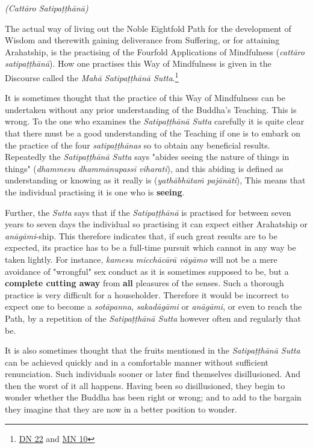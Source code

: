 \emph{(Cattāro Satipaṭṭhānā)}


\label{start}The actual way of living out the Noble Eightfold Path for the
development of Wisdom and therewith gaining deliverance from Suffering,
or for attaining Arahatship, is the practising of the Fourfold
Applications of Mindfulness (\emph{cattāro satipaṭṭhānā}). How one
practises this Way of Mindfulness is given in the Discourse called the
\emph{Mahā Satipaṭṭhānā Sutta}.\footnote{\href{https://suttacentral.net/dn22/en/sujato}{DN 22} and \href{https://suttacentral.net/mn10/en/sujato}{MN 10}}


It is sometimes thought that the practice of this Way of Mindfulness can
be undertaken without any prior understanding of the Buddha’s Teaching.
This is wrong. To the one who examines the \emph{Satipaṭṭhānā Sutta} carefully
it is quite clear that there must be a good understanding of the
Teaching if one is to embark on the practice of the four \emph{satipaṭṭhānas}
so to obtain any beneficial results. Repeatedly the \emph{Satipaṭṭhānā Sutta}
says "abides seeing the nature of things in things" (\emph{dhammesu
dhammānupassī viharati}),
and this abiding is defined as understanding or knowing as
it really is (\emph{yathābhūtaṁ pajānāti}), This means that the individual
practising it is one who is \textbf{seeing}.


Further, the \emph{Sutta} says that if the \emph{Satipaṭṭhānā} is practised for
between seven years to seven days the individual so practising it can
expect either Arahatship or \emph{anāgāmi}-ship. This therefore indicates
that, if such great results are to be expected, its practice has to be a
full-time pursuit which cannot in any way be taken lightly. For
instance, \emph{kamesu micchācārā vāyāmo} will not be a mere avoidance of
"wrongful" sex conduct as it is sometimes supposed to be, but a
\textbf{complete cutting away} from \textbf{all} pleasures of the senses. Such a
thorough practice is very difficult for a householder. Therefore it
would be incorrect to expect one to become a \emph{sotāpanna}, \emph{sakadāgāmi}
or \emph{anāgāmi}, or even to reach the Path, by a repetition of the
\emph{Satipaṭṭhānā Sutta} however often and regularly that be.


It is also sometimes thought that the fruits mentioned in the
\emph{Satipaṭṭhānā Sutta} can be achieved quickly and in a comfortable manner
without sufficient renunciation. Such individuals sooner or later find
themselves disillusioned. And then the worst of it all happens. Having
been so disillusioned, they begin to wonder whether the Buddha has been
right or wrong; and to add to the bargain they imagine that they are now
in a better position to wonder.


